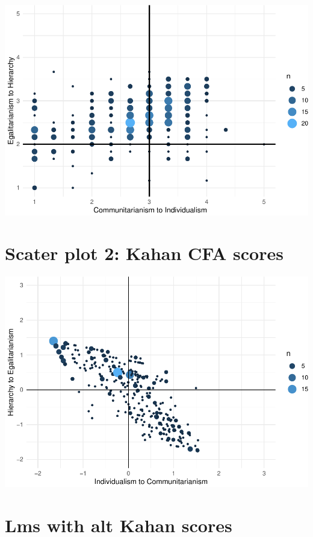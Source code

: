 \documentclass[
]{article}
\begin{document}
\includegraphics{corstuff_files/figure-latex/unnamed-chunk-27-1.pdf}

\hypertarget{scater-plot-2-kahan-cfa-scores}{%
\section{Scater plot 2: Kahan CFA
scores}\label{scater-plot-2-kahan-cfa-scores}}

\includegraphics{corstuff_files/figure-latex/unnamed-chunk-28-1.pdf}

\newpage

\hypertarget{lms-with-alt-kahan-scores}{%
\section{Lms with alt Kahan scores}\label{lms-with-alt-kahan-scores}}
\end{document}

